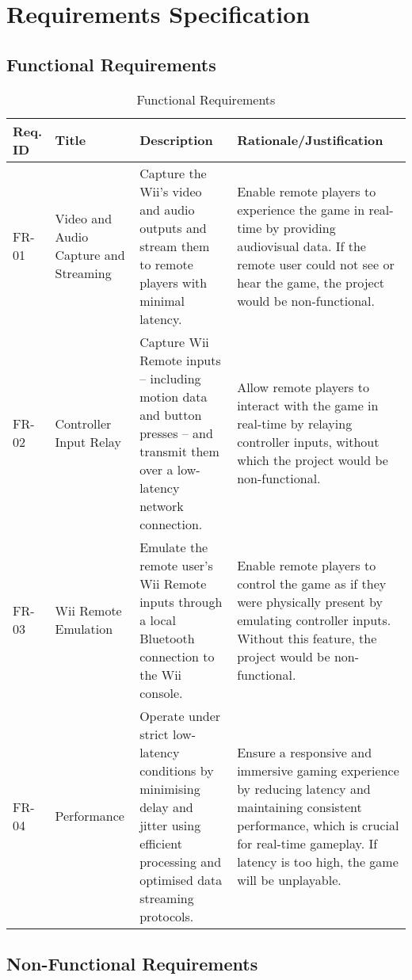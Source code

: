 \chapter{Requirements Specification}
\label{chapter:requirements}

\section{Functional Requirements}

\begin{table}[!ht]
    \centering
    \begin{tabular}{|p{1cm}|p{3cm}|p{5cm}|p{6cm}|}
      \hline
        Req. ID & Title & Description & Rationale/Justification \\ \hline
      FR-01 & Video and Audio Capture and Streaming & Capture the Wii’s video and audio outputs and stream them to remote players with minimal latency. & Enable remote players to experience the game in real-time by providing audiovisual data. If the remote user could not see or hear the game, the project would be non-functional. \\ \hline
      FR-02 & Controller Input Relay & Capture Wii Remote inputs -- including motion data and button presses -- and transmit them over a low-latency network connection. & Allow remote players to interact with the game in real-time by relaying controller inputs, without which the project would be non-functional. \\ \hline
      FR-03 & Wii Remote Emulation & Emulate the remote user's Wii Remote inputs through a local Bluetooth connection to the Wii console. & Enable remote players to control the game as if they were physically present by emulating controller inputs. Without this feature, the project would be non-functional. \\ \hline
      FR-04 & Performance & Operate under strict low-latency conditions by minimising delay and jitter using efficient processing and optimised data streaming protocols. & Ensure a responsive and immersive gaming experience by reducing latency and maintaining consistent performance, which is crucial for real-time gameplay. If latency is too high, the game will be unplayable. \\ \hline
    \end{tabular}
    \caption{Functional Requirements}
    \label{tab:functional-requirements}
\end{table}

\pagebreak
\section{Non-Functional Requirements}

